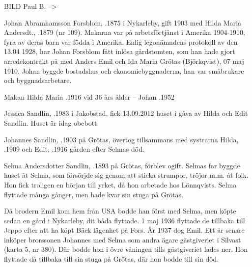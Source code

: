 BILD Paul B. -->

Johan Abramhamsson Forsblom, .1875 i Nykarleby, gift 1903 med Hilda Maria Andersdt., .1879 (nr 109).  Makarna var på arbetsförtjänst i Amerika 1904-1910, fyra av deras barn var födda i Amerika. Enlig legonämndens protokoll av den 13.04 1928, har Johan Forsblom fått inlösa gårdstomten, som han hade gjort arredekontrakt  på  med Anders Emil och Ida Maria Grötas (Björkqvist), 07 maj 1910. Johan byggde bostadshus och ekonomiebyggnaderna, han var småbrukare och byggnadsarbetare.
\begin{jhchildren}
  \item {}
  \item {}
  \item {}
  \item {}
  \item {}
\end{jhchildren}

Makan Hilda Maria .1916 vid 36 års ålder  --  Johan .1952




Jessica Sandlin, .1983  i Jakobstad, fick 13.09.2012 huset i gåva av Hilda och Edit Sandlin. Huset är idag obebott.


Johannes Sandlin, .1903 på Grötas, övertog tillsammans med systrarna Hilda, .1909 och Edit, .1916 gården efter Selmas död.


Selma  Andersdotter Sandlin, .1893 på Grötas, förblev ogift. Selmas far byggde huset åt Selma, som försörjde sig genom att sticka strumpor, tröjor m.m. åt folk. Hon fick troligen en början till yrket, då hon arbetade hos Lönnqvists. Selma flyttade många gånger, men hade kvar sin stuga på Grötas.

Då brodern Emil kom hem från USA bodde han först med Selma, men köpte sedan en gård i Nykarleby, dit båda flyttade. 1 maj 1936 flyttade de tillbaka till Jeppo efter att ha köpt Bäck lägenhet på Fors. År 1937 dog Emil. Ett år senare inköper brorssonen Johannes med Selma som andra ägare gästgiveriet i Silvast (karta 5, nr 380). Där bodde hon i övre våningen tills gästgiveriet lades ner. Hon flyttade då tillbaka till sin stuga på Grötas, där hon bodde till sin död.

